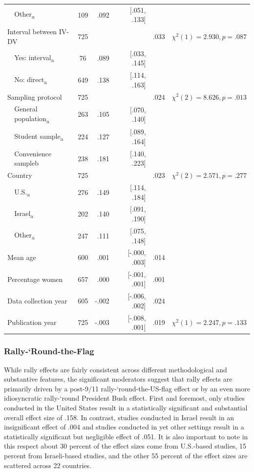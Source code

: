\begin{ThreePartTable}
\begin{longtable}[c]{llcrrcc}
 & Other\textsubscript{a} & 109 & .092 & [.051, .133] &  &  \\
\multicolumn{2}{l}{Interval between IV-DV} & 725 &  &  & .033 & $\chi^2(1)=2.930, p=.087$ \\
 & Yes: interval\textsubscript{a} & 76 & .089 & [.033, .145] &  &  \\
 & No: direct\textsubscript{a} & 649 & .138 & [.114, .163] &  &  \\
\multicolumn{2}{l}{Sampling protocol} & 725 &  &  & .024 & $\chi^2(2)=8.626, p=.013$ \\
 & General population\textsubscript{a} & 263 & .105 & [.070, .140] &  &  \\
 & Student sample\textsubscript{a} & 224 & .127 & [.089, .164] &  &  \\
 & Convenience sampleb & 238 & .181 & [.140, .223] &  &  \\
\multicolumn{2}{l}{Country} & 725 &  &  & .023 & $\chi^2(2)=2.571, p=.277$ \\
 & U.S.\textsubscript{a} & 276 & .149 & [.114, .184] &  &  \\
 & Israel\textsubscript{a} & 202 & .140 & [.091, .190] &  &  \\
 & Other\textsubscript{a} & 247 & .111 & [.075, .148] &  &  \\
\multicolumn{2}{l}{Mean age} & 600 & .001 & [-.000, .003] & .014 &  \\
\multicolumn{2}{l}{Percentage women} & 657 & .000 & [-.001, .001] & .001 &  \\
\multicolumn{2}{l}{Data collection year} & 605 & -.002 & [-.006, .002] & .024 &  \\
\multicolumn{2}{l}{Publication year} & 725 & -.003 & [-.008, .001] & .019 & $\chi^2(1)=2.247, p=.133$ \\* \bottomrule
\end{longtable}
\end{ThreePartTable}

\vspace{3mm}


\subsubsection{Rally-‘Round-the-Flag}

While rally effects are fairly consistent across different methodological and substantive features, the significant moderators suggest that rally effects are primarily driven by a post-9/11 rally-‘round-the-US-flag effect or by an even more idiosyncratic rally-‘round President Bush effect. First and foremost, only studies conducted in the United States result in a statistically significant and substantial overall effect size of .158. In contrast, studies conducted in Israel result in an insignificant effect of .004 and studies conducted in yet other settings result in a statistically significant but negligible effect of .051. It is also important to note in this respect about 30 percent of the effect sizes come from U.S.-based studies, 15 percent from Israeli-based studies, and the other 55 percent of the effect sizes are scattered across 22 countries. 

